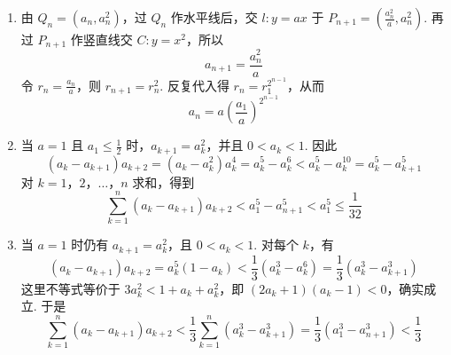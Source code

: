 \begin{solution}
\begin{enumerate}
\item 由 \(Q_n=(a_n,a_n^2)\)，过 \(Q_n\) 作水平线后，交 \(l:y=ax\) 于 \(P_{n+1}=\left(\frac{a_n^2}{a},a_n^2\right)\). 再过 \(P_{n+1}\) 作竖直线交 \(C:y=x^2\)，所以
\[
a_{n+1}=\frac{a_n^2}{a}
\]
令 \(r_n=\frac{a_n}{a}\)，则 \(r_{n+1}=r_n^2\). 反复代入得 \(r_n=r_1^{2^{n-1}}\)，从而
\[
a_n=a\left(\frac{a_1}{a}\right)^{2^{n-1}}
\]
\item 当 \(a=1\) 且 \(a_1\leqslant\frac12\) 时，\(a_{k+1}=a_k^2\)，并且 \(0<a_k<1\). 因此
\[
(a_k-a_{k+1})a_{k+2}=(a_k-a_k^2)a_k^4=a_k^5-a_k^6<a_k^5-a_k^{10}=a_k^5-a_{k+1}^5
\]
对 \(k=1\)，\(2\)，\(\ldots\)，\(n\) 求和，得到
\[
\sum_{k=1}^{n}(a_k-a_{k+1})a_{k+2}<a_1^5-a_{n+1}^5<a_1^5\leqslant\frac1{32}
\]
\item 当 \(a=1\) 时仍有 \(a_{k+1}=a_k^2\)，且 \(0<a_k<1\). 对每个 \(k\)，有
\[
(a_k-a_{k+1})a_{k+2}=a_k^5(1-a_k)<\frac13\left(a_k^3-a_k^6\right)=\frac13\left(a_k^3-a_{k+1}^3\right)
\]
这里不等式等价于 \(3a_k^2<1+a_k+a_k^2\)，即 \((2a_k+1)(a_k-1)<0\)，确实成立. 于是
\[
\sum_{k=1}^{n}(a_k-a_{k+1})a_{k+2}<\frac13\sum_{k=1}^{n}(a_k^3-a_{k+1}^3)=\frac13(a_1^3-a_{n+1}^3)<\frac13
\]
\end{enumerate}
\end{solution}
